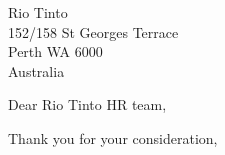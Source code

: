 \documentclass[a4paper]{letter}
\begin{document}
\signature{Ada Stevenson}
\address{216 Lake Street \\ Perth 6000 WA \\ Australia}

\begin{letter}{
    Rio Tinto \\
    152/158 St Georges Terrace \\
    Perth WA 6000 \\
    Australia}
  \opening{Dear Rio Tinto HR team,}

  \closing{Thank you for your consideration,}

\end{letter}
\end{document}
